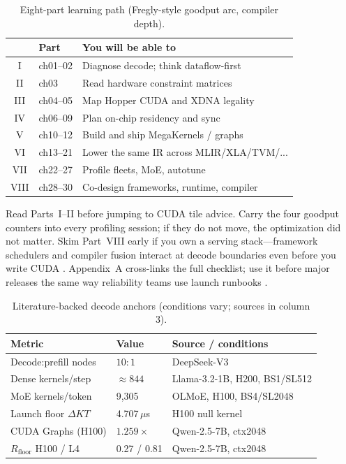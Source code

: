 \begin{table}[t]
\centering
\caption{Eight-part learning path (Fregly-style goodput arc, compiler depth).}
\label{tab:book_roadmap}
\small
\begin{tabular}{@{}clp{3.1in}@{}}
\toprule
 & \textbf{Part} & \textbf{You will be able to} \\
\midrule
I & ch01--02 & Diagnose decode; think dataflow-first \\
II & ch03 & Read hardware constraint matrices \\
III & ch04--05 & Map Hopper CUDA and XDNA legality \\
IV & ch06--09 & Plan on-chip residency and sync \\
V & ch10--12 & Build and ship MegaKernels / graphs \\
VI & ch13--21 & Lower the same IR across MLIR/XLA/TVM/... \\
VII & ch22--27 & Profile fleets, MoE, autotune \\
VIII & ch28--30 & Co-design frameworks, runtime, compiler \\
\bottomrule
\end{tabular}
\end{table}

Read Parts~I--II before jumping to CUDA tile advice.
Carry the four goodput counters into every profiling session; if they do not move, the optimization did not matter.
Skim Part~VIII early if you own a serving stack---framework schedulers and compiler fusion interact at decode boundaries even before you write CUDA \citep{kwon2023vllm,yirage2026}.
Appendix~A cross-links the full checklist; use it before major releases the same way reliability teams use launch runbooks \citep{patel2025llminference}.

\begin{table}[t]
\centering
\caption{Literature-backed decode anchors (conditions vary; sources in column 3).}
\label{tab:verified_snapshot}
\small
\begin{tabular}{p{1.55in}p{1.0in}p{2.1in}}
\toprule
\textbf{Metric} & \textbf{Value} & \textbf{Source / conditions} \\
\midrule
Decode:prefill nodes & $10{:}1$ & DeepSeek-V3 \citep{patel2025llminference} \\
Dense kernels/step & ${\approx}844$ & Llama-3.2-1B, H200, BS1/SL512 \citep{taxbreak2026} \\
MoE kernels/token & 9,305 & OLMoE, H100, BS4/SL2048 \citep{taxbreak2026} \\
Launch floor $\Delta KT$ & 4.707\,$\mu$s & H100 null kernel \citep{taxbreak2026} \\
CUDA Graphs (H100) & $1.259\times$ & Qwen-2.5-7B, ctx2048 \citep{memoryfloor2026} \\
$R_{\mathrm{floor}}$ H100 / L4 & 0.27 / 0.81 & Qwen-2.5-7B, ctx2048 \citep{memoryfloor2026} \\
\bottomrule
\end{tabular}
\end{table}

